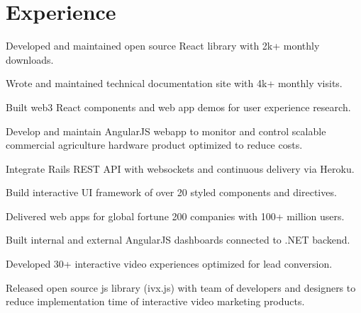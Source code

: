 \documentclass[]{deedy-resume-openfont}
\begin{document}
\begin{minipage}[t]{0.66\textwidth}


\section{Experience}

\vspace{\topsep} %
\begin{tightemize}
\item Developed and maintained open source React library with 2k+ monthly downloads. \item Wrote and maintained technical documentation site with 4k+ monthly visits. \item Built web3 React components and web app demos for user experience research. \end{tightemize}
\sectionsep


\begin{tightemize}
\item Develop and maintain AngularJS webapp to monitor and control scalable commercial agriculture hardware product optimized to reduce costs. \item Integrate Rails REST API with websockets and continuous delivery via Heroku. \item Build interactive UI framework of over 20 styled components and directives. \end{tightemize}
\sectionsep

\begin{tightemize}
\item Delivered web apps for global fortune 200 companies with 100+ million users.\item Built internal and external AngularJS dashboards connected to .NET backend.\item Developed 30+ interactive video experiences optimized for lead conversion.\item Released open source js library (ivx.js) with team of developers and designers to reduce implementation time of interactive video marketing products.\end{tightemize}
\sectionsep


\end{minipage}
\end{document}
